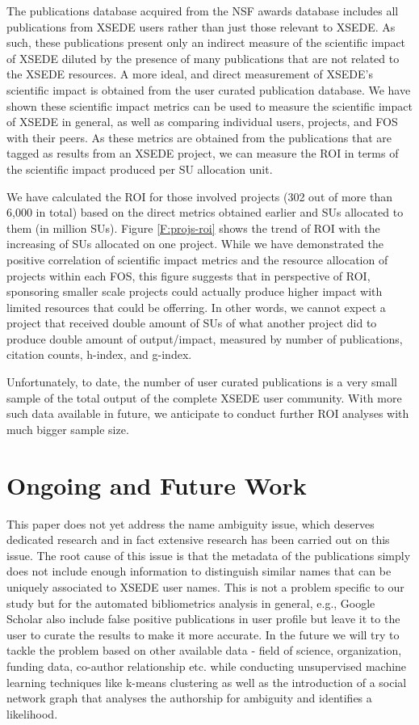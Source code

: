 \documentclass{sig-alternate}
\begin{document}
The publications database acquired from the NSF awards database includes all publications from XSEDE users rather than just those relevant to XSEDE. As such, these publications present only an indirect measure of the scientific impact of XSEDE diluted by the presence of many publications that are not related to the XSEDE resources. A more ideal, and direct measurement of XSEDE's scientific impact is obtained from the user curated publication database. We have shown these scientific impact metrics can be used to measure the scientific impact of XSEDE in general, as well as comparing individual users, projects, and FOS with their peers. As these metrics are obtained from the publications that are tagged as results from an XSEDE project, we can measure the ROI in terms of the scientific impact produced per SU allocation unit.

We have calculated the ROI for those involved projects (302 out of more than 6,000 in total) based on the direct metrics obtained earlier and SUs allocated to them (in million SUs). Figure \ref{F:projs-roi} shows the trend of ROI with the increasing of SUs allocated on one project. While we have demonstrated the positive correlation of scientific impact metrics and the resource allocation of projects within each FOS, this figure suggests that in perspective of ROI, sponsoring smaller scale projects could actually produce higher impact with limited resources that could be offerring. In other words, we cannot expect a project that received double amount of SUs of what another project did to produce double amount of output/impact, measured by number of publications, citation counts, h-index, and g-index.

Unfortunately, to date, the number of user curated publications is a very small sample of the total output of the complete XSEDE user community. With more such data available in future, we anticipate to conduct further ROI analyses with much bigger sample size.

\section{Ongoing and Future Work} \label{S:futurework}
 
This paper does not yet address the name ambiguity issue, which deserves dedicated research and in fact extensive research has been carried out on this issue. The root cause of this issue is that the metadata of the publications simply does not include enough information to distinguish similar names that can be uniquely associated to XSEDE user names. This is not a problem specific to our study but for the automated bibliometrics analysis in general, e.g., Google Scholar also include false positive publications in user profile but leave it to the user to curate the results to make it more accurate. In the future we will try to tackle the problem based on other available data - field of science, organization, funding data, co-author relationship etc. while conducting unsupervised machine learning techniques like k-means clustering as well as the introduction of a social network graph that analyses the authorship for ambiguity and identifies a likelihood.
 
\end{document}
